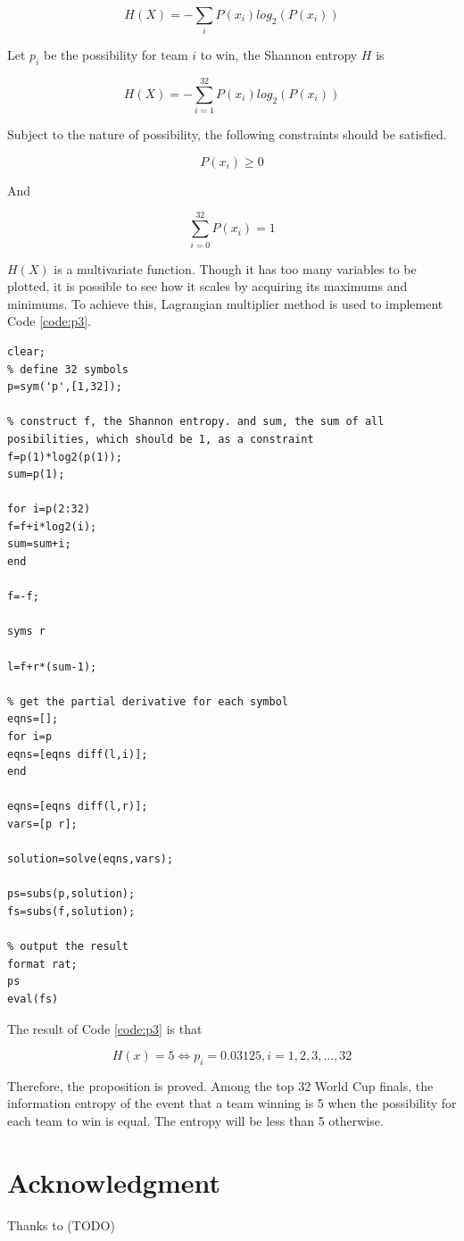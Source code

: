 \documentclass[12pt]{article}
\begin{document}
\begin{equation}
	H(X)=-\sum_{i}P(x_i)log_2(P(x_i))
\end{equation}

Let $p_i$ be the possibility for team $i$ to win, the Shannon entropy $H$ is

\begin{equation}
	H(X)=-\sum_{i=1}^{32}P(x_i)log_2(P(x_i))
\end{equation}

Subject to the nature of possibility, the following constraints should be satisfied.

\begin{equation}
	P(x_i) \ge 0
\end{equation}

And

\begin{equation}
	\sum_{i=0}^{32}P(x_i) = 1
\end{equation}

$H(X)$ is a multivariate function. Though it has too many variables to be plotted, it is possible to see how it scales by acquiring its maximums and minimums. To achieve this, Lagrangian multiplier method is used to implement Code \ref{code:p3}.

\begin{lstlisting}[style=MatlabStyle,caption=Get the maximum for $H(x)$,label=code:p3]
clear;
% define 32 symbols
p=sym('p',[1,32]);

% construct f, the Shannon entropy. and sum, the sum of all posibilities, which should be 1, as a constraint
f=p(1)*log2(p(1));
sum=p(1);

for i=p(2:32)
f=f+i*log2(i);
sum=sum+i;
end

f=-f;

syms r

l=f+r*(sum-1);

% get the partial derivative for each symbol
eqns=[];
for i=p
eqns=[eqns diff(l,i)];
end

eqns=[eqns diff(l,r)];
vars=[p r];

solution=solve(eqns,vars);

ps=subs(p,solution);
fs=subs(f,solution);

% output the result
format rat;
ps
eval(fs)
\end{lstlisting}

The result of Code \ref{code:p3} is that

\begin{equation}
	H(x)=5  \iff  p_i=0.03125, i=1,2,3,...,32
\end{equation}

Therefore, the proposition is proved. Among the top 32 World Cup finals, the information entropy of the event that a team winning is 5 when the possibility for each team to win is equal. The entropy will be less than 5 otherwise.
\section{Acknowledgment}

Thanks to (TODO)
\end{document}
